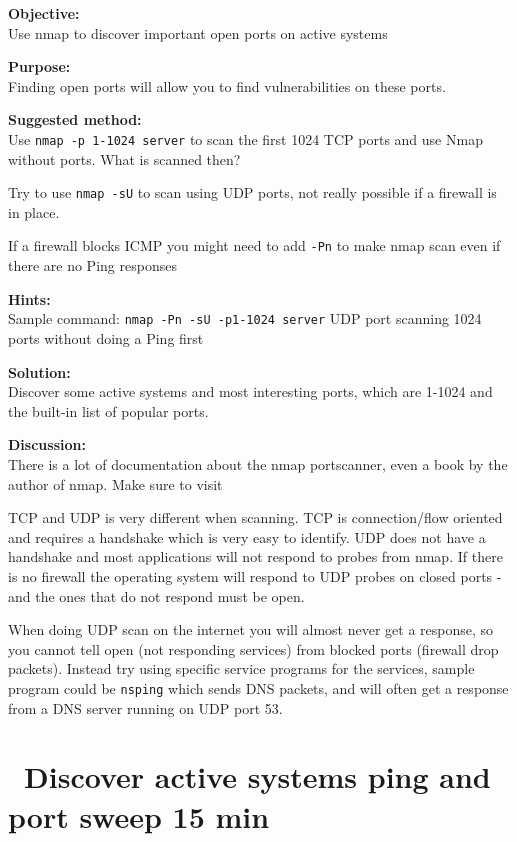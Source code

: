 \documentclass[a4paper,11pt,notitlepage]{report}
\begin{document}
{\bf Objective:} \\
Use nmap to discover important open ports on active systems

{\bf Purpose:}\\
Finding open ports will allow you to find vulnerabilities on these ports.

{\bf Suggested method:}\\
Use \verb+nmap -p 1-1024 server+ to scan the first 1024 TCP
ports and use Nmap without ports. What is scanned then?

Try to use \verb+nmap -sU+ to scan using UDP ports, not really possible if a firewall is in place.

If a firewall blocks ICMP you might need to add \verb+-Pn+ to make nmap scan even if there are no Ping responses

{\bf Hints:} \\
Sample command: \verb+nmap -Pn -sU -p1-1024 server+ UDP port scanning
1024 ports without doing a Ping first

{\bf Solution:}\\
Discover some active systems and most interesting ports, which are 1-1024 and the built-in list of popular ports.

{\bf Discussion:}\\
There is a lot of documentation about the nmap portscanner, even a book by the author
of nmap. Make sure to visit 

TCP and UDP is very different when scanning. TCP is connection/flow oriented and requires a handshake which is very easy to identify. UDP does not have a handshake and most applications will not respond to probes from nmap. If there is no firewall the operating system will respond to UDP probes on closed ports - and the ones that do not respond must be open.

When doing UDP scan on the internet you will almost never get a response, so you cannot tell open (not responding services) from blocked ports (firewall drop packets). Instead try using specific service programs for the services, sample program could be \verb+nsping+ which sends DNS packets, and will often get a response from a DNS server running on UDP port 53.


\chapter{\faExclamationTriangle\ Discover active systems ping and port sweep 15 min}
\label{ex:nmap-pingsweep}
\end{document}
